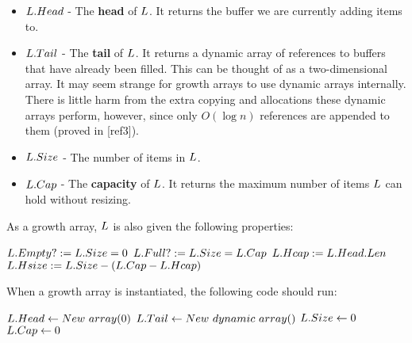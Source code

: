 \begin{itemize}
	\item $L.Head$ - The \textbf{head} of $\VarList$. It returns the buffer we are currently adding items to.
	\item $L.Tail$ - The \textbf{tail} of $\VarList$. It returns a dynamic array of references to buffers that have already been filled. This can be thought of as a two-dimensional array.
		\subitem It may seem strange for growth arrays to use dynamic arrays internally. There is little harm from the extra copying and allocations these dynamic arrays perform, however, since only $O(\log n)$ references are appended to them (proved in [ref3]).
	\item $L.Size$ - The number of items in $\VarList$.
	\item $L.Cap$ - The \textbf{capacity} of $\VarList$. It returns the maximum number of items $\VarList$ can hold without resizing.
\end{itemize}

As a growth array, $\VarList$ is also given the following properties:

\begin{algorithm}
	\begin{algorithmic}
		\State $L.Empty? := L.Size = 0$
		\State
		\State $L.Full? := L.Size = L.Cap$
		\State
		\State $L.Hcap := L.Head.Len$
		\State
		\State $L.Hsize := L.Size - \left(L.Cap - L.Hcap\right)$
	\end{algorithmic}
\end{algorithm}

When a growth array is instantiated, the following code should run:

\begin{algorithm}
	\begin{algorithmic}
		\Procedure{$\FuncConstructor$}{$\VarList$}
			\State $L.Head \gets New\ array(0)$
			\State $L.Tail \gets New\ dynamic\ array()$
			\State $L.Size \gets 0$
			\State $L.Cap \gets 0$
		\EndProcedure
	\end{algorithmic}
\end{algorithm}